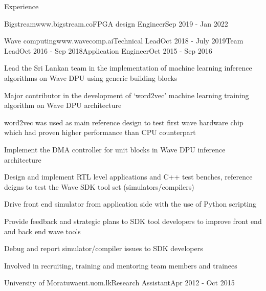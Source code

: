 \documentclass[
11pt, %
]{./assets/resume} %
\begin{document}
\begin{rSection}{Experience}
\begin{rSubsectionX}{Bigstream}{www.bigstream.co}{FPGA design Engineer}{Sep 2019 - Jan 2022}
	\end{rSubsectionX}
	\begin{rSubsectionM}{Wave computing}{www.wavecomp.ai}{Technical Lead}{Oct 2018 - July 2019}{Team Lead}{Oct 2016 - Sep 2018}{Application Engineer}{Oct 2015 - Sep 2016}
		\item Lead the Sri Lankan team in the implementation of machine learning inference algorithms on Wave DPU using generic building blocks
		\item Major contributor in the development of `word2vec' machine learning training algorithm on Wave DPU architecture
		\item word2vec was used as main reference design to test first wave hardware chip which had proven higher performance than CPU counterpart
		\item Implement the DMA controller for unit blocks in Wave DPU inference architecture
		\item Design and implement RTL level applications and C++ test benches, reference deigns to test the Wave SDK tool set (simulators/compilers)
		\item Drive front end simulator from application side with the use of Python scripting
		\item Provide feedback and strategic plans to SDK tool developers to improve front end and back end wave tools
		\item Debug and report simulator/compiler issues to SDK developers
		\item Involved in recruiting, training and mentoring team members and trainees
	\end{rSubsectionM}
	\begin{rSubsectionSimpleX}{University of Moratuwa}{ent.uom.lk}{Research Assistant}{Apr 2012 - Oct 2015}
	\end{rSubsectionSimpleX}
	
\end{rSection}
\end{document}
